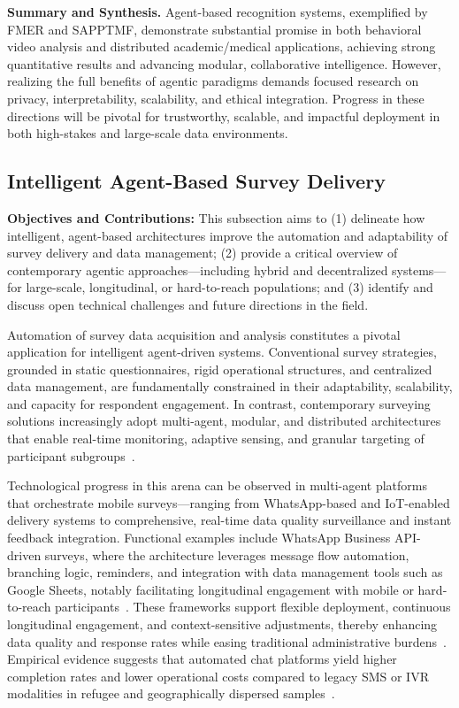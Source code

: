 \documentclass[sigconf]{acmart}
\begin{document}
\textbf{Summary and Synthesis.} Agent-based recognition systems, exemplified by FMER and SAPPTMF, demonstrate substantial promise in both behavioral video analysis and distributed academic/medical applications, achieving strong quantitative results and advancing modular, collaborative intelligence. However, realizing the full benefits of agentic paradigms demands focused research on privacy, interpretability, scalability, and ethical integration. Progress in these directions will be pivotal for trustworthy, scalable, and impactful deployment in both high-stakes and large-scale data environments.

\subsection{Intelligent Agent-Based Survey Delivery}

\textbf{Objectives and Contributions:} This subsection aims to (1) delineate how intelligent, agent-based architectures improve the automation and adaptability of survey delivery and data management; (2) provide a critical overview of contemporary agentic approaches—including hybrid and decentralized systems—for large-scale, longitudinal, or hard-to-reach populations; and (3) identify and discuss open technical challenges and future directions in the field.

Automation of survey data acquisition and analysis constitutes a pivotal application for intelligent agent-driven systems. Conventional survey strategies, grounded in static questionnaires, rigid operational structures, and centralized data management, are fundamentally constrained in their adaptability, scalability, and capacity for respondent engagement. In contrast, contemporary surveying solutions increasingly adopt multi-agent, modular, and distributed architectures that enable real-time monitoring, adaptive sensing, and granular targeting of participant subgroups~\cite{ref112}\cite{ref113}\cite{ref117}.

Technological progress in this arena can be observed in multi-agent platforms that orchestrate mobile surveys—ranging from WhatsApp-based and IoT-enabled delivery systems to comprehensive, real-time data quality surveillance and instant feedback integration. Functional examples include WhatsApp Business API-driven surveys, where the architecture leverages message flow automation, branching logic, reminders, and integration with data management tools such as Google Sheets, notably facilitating longitudinal engagement with mobile or hard-to-reach participants~\cite{ref117}. These frameworks support flexible deployment, continuous longitudinal engagement, and context-sensitive adjustments, thereby enhancing data quality and response rates while easing traditional administrative burdens~\cite{ref112}\cite{ref113}. Empirical evidence suggests that automated chat platforms yield higher completion rates and lower operational costs compared to legacy SMS or IVR modalities in refugee and geographically dispersed samples~\cite{ref117}.
\end{document}
